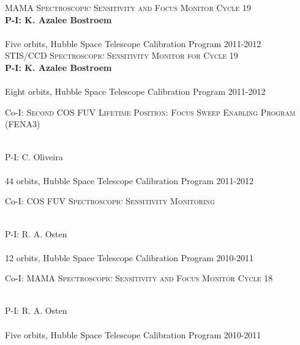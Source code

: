 \documentclass[10pt]{cv}
\begin{document}
\begin{llist}
\textsc{MAMA Spectroscopic Sensitivity and Focus Monitor Cycle 19}\\
{\bf P-I: K. Azalee Bostroem} \\ %
\\
Five orbits, Hubble Space Telescope Calibration Program \hfill 2011-2012\\ %
\textsc{STIS/CCD Spectroscopic Sensitivity Monitor for Cycle 19}\\
{\bf P-I: K. Azalee Bostroem} \\ %
\\
Eight orbits, Hubble Space Telescope Calibration Program \hfill 2011-2012\\ %
\begin{minipage}[l]{0.7\textwidth}\vspace{0.15cm}
Co-I: \textsc{Second COS FUV Lifetime Position: Focus Sweep Enabling Program (FENA3)} 
\end{minipage}\vspace{0.15cm}\\
P-I: C. Oliveira \\%
\\
44 orbits, Hubble Space Telescope Calibration Program \hfill 2011-2012\\ %
\begin{minipage}[l]{0.7\textwidth}\vspace{0.15cm}
Co-I: \textsc{COS FUV Spectroscopic Sensitivity Monitoring} 
\end{minipage}\vspace{0.15cm}\\
P-I: R. A. Osten\\%
\\
12 orbits, Hubble Space Telescope Calibration Program \hfill 2010-2011\\ %
\begin{minipage}[l]{0.7\textwidth}\vspace{0.15cm}
Co-I: \textsc{MAMA Spectroscopic Sensitivity and Focus Monitor Cycle 18} \\
\end{minipage}\vspace{0.15cm}\\
P-I: R. A. Osten \\%
\\
Five orbits, Hubble Space Telescope Calibration Program \hfill 2010-2011\\ %

\end{llist}
\end{document}
